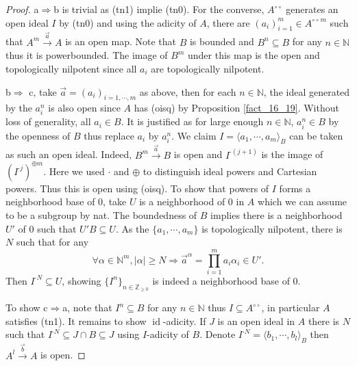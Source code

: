 \documentclass[8pt]{article}
\numberwithin{equation}{section}
\DeclareMathOperator{\id}{id}
\newcommand{\N}[0]{\mathbb{N}}
\newcommand{\Z}[0]{\mathbb{Z}}
\newcommand{\ab}[1]{\vert #1 \vert}
\newcommand{\dcirc}[0]{{\circ\circ}}
\begin{document}
\begin{proof}
    a$\Rightarrow$b is trivial as (tn1) implie (tn0). For the converse,  $A^\dcirc$ generates an open ideal $I$ by (tn0) and using the adicity of $A$, there are $(a_i)_{i=1}^m\in {A^\dcirc}^m$ such that $A^m\stackrel{\vec{a}}{\to} A$ is an open map. 
    Note that $B$ is bounded and $B^n\subseteq B$ for any $n\in\N$ thus it is powerbounded. The image of $B^m$ under this map is the open and topologically nilpotent since all $a_i$ are topologically nilpotent.
    \par b$\Rightarrow$ c, take $\vec{a}=(a_i)_{i=1,\cdots,m}$ as above, then for each $n\in\N$, the ideal generated by the $a_i^n$ is also open since $A$ has (oisq) by Proposition \ref{fact_16_19}. Without loss of generality, all $a_i\in B$. It is justified as for large enough $n\in\N$, $a_i^n\in B$ by the openness of $B$ thus replace $a_i$ by $a_i^n$. We claim $I=\langle a_1,\cdots,a_m\rangle_B$ can be taken as such an open ideal. Indeed, $B^m\stackrel{\vec{a}}{\to} B$ is open and $I^{\cdot(j+1)}$ is the image of $(I^{\cdot j})^{\oplus m}$. 
    Here we used $\cdot$ and $\oplus$ to distinguish ideal powers and Cartesian powers. Thus this is open using (oisq). 
    To show that powers of $I$ forms a neighborhood base of $0$, take $U$ is a neighborhood of $0$ in $A$ which we can assume to be a subgroup by nat. The boundedness of $B$ implies there is a neighborhood $U'$ of $0$ such that $U'B\subseteq U$. 
    As the $\{a_1,\cdots,a_m\}$ is topologically nilpotent, there is $N$ such that for any 
    \begin{equation*}
    \forall\alpha\in\N^m,\ab{\alpha}\geq N\Rightarrow \vec{a}^\alpha = \prod_{i=1}^m a_i\alpha_i\in U'.
    \end{equation*}
    Then $I^{\cdot N}\subseteq U$, showing $\{I^n\}_{n\in\Z_{\geq0}}$ is indeed a neighborhood base of $0$.
    \par To show c$\Rightarrow$a, note that $I^n\subseteq B$ for any $n\in\N$ thus $I\subseteq A^\dcirc$, in particular $A$ satisfies (tn1). It remains to show $\id$-adicity. 
    If $J$ is an open ideal in $A$ there is $N$ such that $I^{\cdot N}\subseteq J\cap B\subseteq J$ using $I$-adicity of $B$. Denote $I^{\cdot N}=\langle b_1,\cdots,b_l\rangle_B$ then $A^l\stackrel{\vec{b}}{\to}A$ is open. 
\end{proof}
\end{document}
